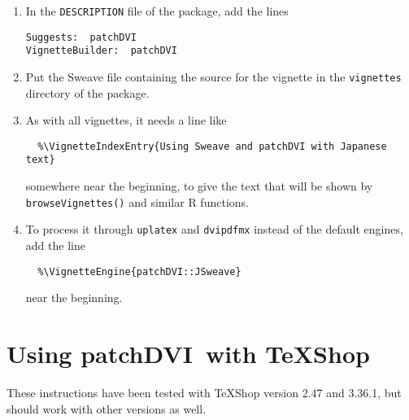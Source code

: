 \documentclass[12pt]{ujarticle}
\newcommand{\patchDVI}{\patchDVIn\ }
\newcommand{\patchDVIn}{\textbf{patchDVI}}
\begin{document}
\begin{enumerate}
\item In the \texttt{DESCRIPTION} file of the package, add the lines
\begin{verbatim}
Suggests:  patchDVI
VignetteBuilder:  patchDVI
\end{verbatim}


\item Put the Sweave file containing the source for the vignette in the \texttt{vignettes}
directory of the package.  

\item As with all vignettes, it needs a line like 
\begin{verbatim}
  %\VignetteIndexEntry{Using Sweave and patchDVI with Japanese text}
\end{verbatim}
somewhere near the beginning, to give the text that will be shown by \verb!browseVignettes()!
and similar R functions.

\item To process it through \texttt{uplatex} and \texttt{dvipdfmx} instead of the default
engines, add the line
\begin{verbatim}
  %\VignetteEngine{patchDVI::JSweave}
\end{verbatim}
near the beginning.
\end{enumerate}

\section{Using \patchDVI with TeXShop}
\label{sec:texshop}

These instructions have been tested with TeXShop version 2.47 and 3.36.1, but should work with 
other versions as well.
\end{document}
